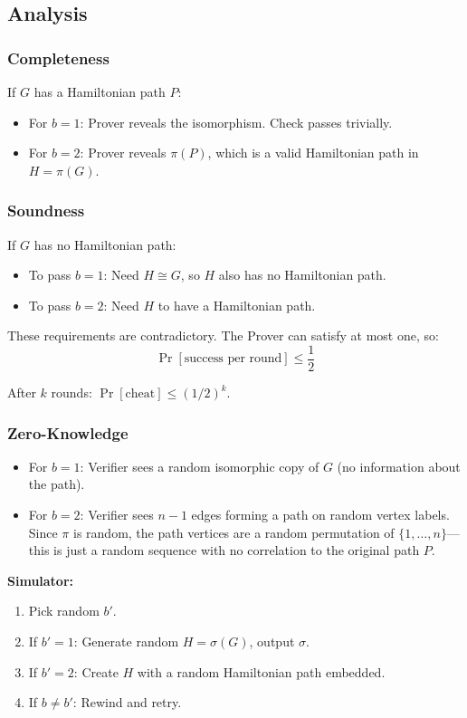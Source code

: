 \documentclass[11pt]{article}
\begin{document}
\subsection{Analysis}

\subsubsection{Completeness}
If $G$ has a Hamiltonian path $P$:
\begin{itemize}
    \item For $b = 1$: Prover reveals the isomorphism. Check passes trivially.
    \item For $b = 2$: Prover reveals $\pi(P)$, which is a valid Hamiltonian path in $H = \pi(G)$.
\end{itemize}

\subsubsection{Soundness}
If $G$ has no Hamiltonian path:
\begin{itemize}
    \item To pass $b = 1$: Need $H \cong G$, so $H$ also has no Hamiltonian path.
    \item To pass $b = 2$: Need $H$ to have a Hamiltonian path.
\end{itemize}

These requirements are contradictory. The Prover can satisfy at most one, so:
\[
\Pr[\text{success per round}] \leq \frac{1}{2}
\]

After $k$ rounds: $\Pr[\text{cheat}] \leq (1/2)^k$.

\subsubsection{Zero-Knowledge}
\begin{itemize}
    \item For $b = 1$: Verifier sees a random isomorphic copy of $G$ (no information about the path).
    \item For $b = 2$: Verifier sees $n-1$ edges forming a path on random vertex labels. Since $\pi$ is random, the path vertices are a random permutation of $\{1, \ldots, n\}$---this is just a random sequence with no correlation to the original path $P$.
\end{itemize}

\textbf{Simulator:} 
\begin{enumerate}
    \item Pick random $b'$.
    \item If $b' = 1$: Generate random $H = \sigma(G)$, output $\sigma$.
    \item If $b' = 2$: Create $H$ with a random Hamiltonian path embedded.
    \item If $b \neq b'$: Rewind and retry.
\end{enumerate}
\end{document}

